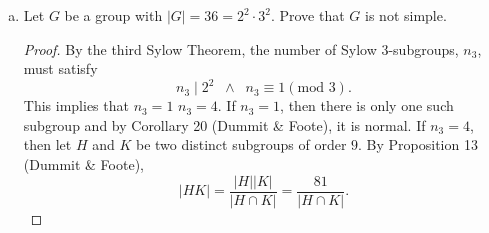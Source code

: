 \documentclass[12pt]{article}
\begin{document}
\begin{enumerate}
\begin{enumerate}[(a)]
                    \begin{proof}
                        By the third Sylow Theorem, we have that the number of
                        Sylow 5-subgroups, $n_5$, and the number of Sylow
                        13-subgroups, $n_{13}$, must satisfy
                        \begin{align*}
                            &n_5\mid2^3\cdot13\;\;\land\;\;n_5\equiv1(\text{mod
                            }5), \\
                            &n_{13}\mid 2^3\cdot 5\;\;\land\;\;
                            n_{13}\equiv1(\text{mod }13).
                        \end{align*}
                        This implies that $n_5\in\{1, 26\}$ and $n_{13}\in\{1,
                        40\}$. Assuming that neither $n_5$ and $n_{13}$ are
                        equal to 1, then it follows that there are
                        $26(5-1)=104$ elements in $G$ of order 5, and
                        $40(13-1)=480$ elements in $G$ of order 13. A total of
                        584 distict elements. As this is a contradiction, it
                        follows that either $n_5=1$ or $n_{13}=1$ is whichever
                        it is presents a nontrivial normal subgroup. Therefore
                        $G$ is not simple. 
                    \end{proof}
                \item Let $G$ be a group with $|G|=36=2^2\cdot3^2$. Prove that
                    $G$ is not simple. 
                    \begin{proof}
                        By the third Sylow Theorem, the number of Sylow
                        3-subgroups, $n_3$, must satisfy
                        \begin{equation*}
                            n_3\mid 2^2\;\;\land\;\; n_3\equiv 1(\text{mod }3).
                        \end{equation*}
                        This implies that $n_3=1$ $n_3=4$. If $n_3=1$, then
                        there is only one such subgroup and by Corollary 20
                        (Dummit \& Foote), it is normal. If $n_3=4$, then let
                        $H$ and $K$ be two distinct subgroups of order $9$. By
                        Proposition 13 (Dummit \& Foote), 
                        \begin{equation*}
                            |HK|=\frac{|H| |K|}{|H\cap K|}=\frac{81}{|H\cap
                            K|}.

\end{equation*}
\end{proof}
\end{enumerate}
\end{enumerate}
\end{document}
